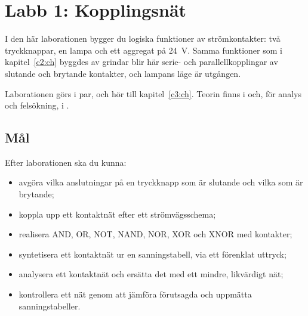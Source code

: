 %
%

\makeatletter
\providecommand{\labprep}[3][]{\prep{#2\if\relax\detokenize{#1}\relax\else\ -- #1\fi}%
  \phantomsection\def\@currentlabel{#2}\label{#3}}
\makeatother

\chapter{Labb 1: Kopplingsnät}
\label{app:lab1}

I den här laborationen bygger du logiska funktioner av strömkontakter: två tryckknappar, en lampa
och ett aggregat på 24~V. Samma funktioner som i kapitel~\ref{c2:ch} byggdes av grindar blir här
serie- och parallellkopplingar av slutande och brytande kontakter, och lampans läge är utgången.

Laborationen görs i par, och hör till kapitel~\ref{c3:ch}. Teorin finns i  och,
för analys och felsökning, i .

\section{Mål}
\label{lab1:sec:goals}
Efter laborationen ska du kunna:
\begin{itemize}
  \item avgöra vilka anslutningar på en tryckknapp som är slutande och vilka som är brytande;
  \item koppla upp ett kontaktnät efter ett strömvägsschema;
  \item realisera AND, OR, NOT, NAND, NOR, XOR och XNOR med kontakter;
  \item syntetisera ett kontaktnät ur en sanningstabell, via ett förenklat uttryck;
  \item analysera ett kontaktnät och ersätta det med ett mindre, likvärdigt nät;
  \item kontrollera ett nät genom att jämföra förutsagda och uppmätta sanningstabeller.
\end{itemize}

